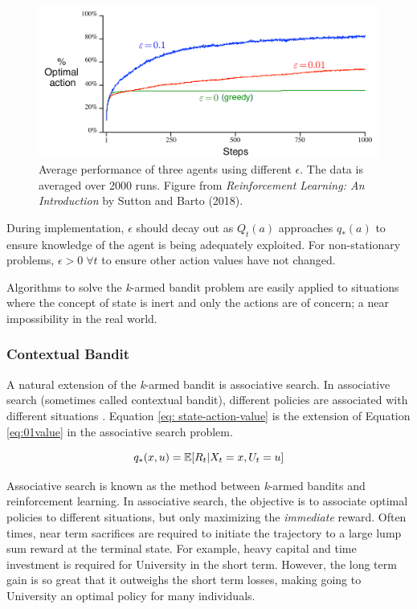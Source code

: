 \begin{figure}[H]
    \centering
    \includegraphics[scale=0.35]{images/eps_vs_optAction.png}
    \caption{Average performance of three agents using different $\epsilon$.  The data is averaged over 2000 runs.  Figure from \textit{Reinforcement Learning: An Introduction} by Sutton and Barto (2018).}
    \label{fig: eps_figure}
\end{figure}

During implementation, $\epsilon$ should decay out as $Q_t(a)$ approaches $q_*(a)$ to ensure knowledge of the agent is being adequately exploited. For non-stationary problems, $\epsilon > 0 \; \forall t$ to ensure other action values have not changed.

Algorithms to solve the \textit{k}-armed bandit problem are easily applied to situations where the concept of state is inert and only the actions are of concern;  a near impossibility in the real world.  

\subsubsection{Contextual Bandit}

A natural extension of the \textit{k}-armed bandit is associative search.  In associative search (sometimes called contextual bandit), different policies are associated with different situations \cite{bartosuttonbrouwer}.  Equation \ref{eq: state-action-value} is the extension of Equation \ref{eq:01value} in the associative search problem.

\begin{equation}
    \centering
    q_*(x, u) = \mathbb{E}[R_t | X_t = x, U_t = u]
    \label{eq: state-action-value}
\end{equation}

Associative search is known as the method between \textit{k}-armed bandits and reinforcement learning.  In associative search, the objective is to associate optimal policies to different situations, but only maximizing the \textit{immediate} reward.  Often times, near term sacrifices are required to initiate the trajectory to a large lump sum reward at the terminal state.  For example, heavy capital and time investment is required for University in the short term.  However, the long term gain is so great that it outweighs the short term losses, making going to University an optimal policy for many individuals.

